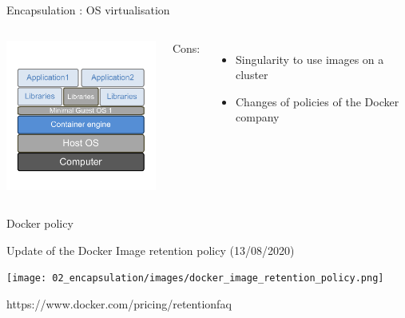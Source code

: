 \begin{frame}{Encapsulation : OS virtualisation}
\begin{columns}

\includegraphics[width=6cm]{02_encapsulation/figures/intro_encapsulation_v2-10.pdf}


Cons:
\begin{itemize}
  \item Singularity to use images on a cluster
  \item Changes of policies of the Docker company
\end{itemize}

\end{columns}
\end{frame}


\begin{frame}{Docker policy}

\centering Update of the Docker Image retention policy (13/08/2020)

\texttt{[image: 02\_encapsulation/images/docker\_image\_retention\_policy.png]}

https://www.docker.com/pricing/retentionfaq

\end{frame}

